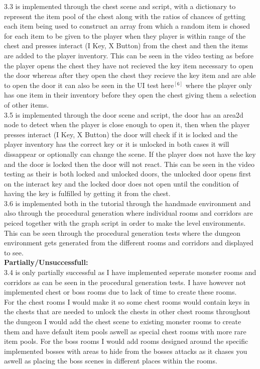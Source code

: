 \documentclass{article}
\begin{document}
        3.3 is implemented through the chest scene and script, with a dictionary to represent the item pool of the chest along with the ratios of chances of getting each item being used to construct an array from which a random item is chosed for each item to be given to the player when they player is within range of the chest and presses interact (I Key, X Button) from the chest and then the items are added to the player inventory. This can be seen in the video testing as before the player opens the chest they have not recieved the key item necessary to open the door whereas after they open the chest they recieve the key item and are able to open the door it can also be seen in the UI test here$^{[6]}$ where the player only has one item in their inventory before they open the chest giving them a selection of other items.\\
        3.5 is implemented through the door scene and script, the door has an area2d node to detect when the player is close enough to open it, then when the player presses interact (I Key, X Button) the door will check if it is locked and the player inventory has the correct key or it is unlocked in both cases it will dissappear or optionally can change the scene. If the player does not have the key and the door is locked then the door will not react. This can be seen in the video testing as their is both locked and unlocked doors, the unlocked door opens first on the interact key and the locked door does not open until the condition of having the key is fulfilled by getting it from the chest.\\
        3.6 is implemented both in the tutorial through the handmade environment and also through the procedural generation where individual rooms and corridors are peiced together with the graph script in order to make the level environments. This can be seen through the procedural generation tests where the dungeon environment gets generated from the different rooms and corridors and displayed to see.\\
        \textbf{Partially/Unsuccessfull:}\\
        3.4 is only partially successful as I have implemented seperate monster rooms and corridors as can be seen in the procedural generation tests. I have however not implemented chest or boss rooms due to lack of time to create these rooms.\\
        For the chest rooms I would make it so some chest rooms would contain keys in the chests that are needed to unlock the chests in other chest rooms throughout the dungeon I would add the chest scene to existing monster rooms to create them and have default item pools aswell as special chest rooms with more rare item pools. For the boss rooms I would add rooms designed around the specific implemented bosses with areas to hide from the bosses attacks as it chases you aswell as placing the boss scenes in different places within the rooms.\\
\end{document}
